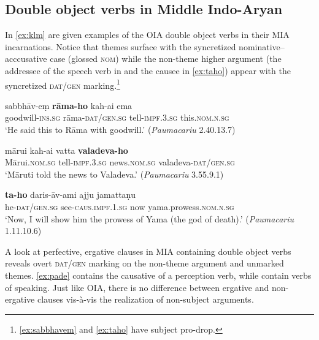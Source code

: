 \documentclass[output=paper,
modfonts
]{LSP/langsci}
\begin{document}
\subsection{Double object verbs in  Middle Indo-Aryan}
In \cref{ex:klm} are given examples of  the OIA double object  verbs in their MIA incarnations. Notice that themes surface with the syncretized nominative--acccusative case (glossed \textsc{nom}) while the non-theme higher argument (the addressee of the speech verb in  and the causee in \cref{ex:taho}) appear with the syncretized \textsc{dat/gen} marking.\footnote{\cref{ex:sabbhavem} and \cref{ex:taho} have subject pro-drop.} 
 
\begin{exe}
\ex\label{ex:klm}
\begin{xlist}
\ex\label{ex:sabbhavem}\gll sabbhāv-eṃ \textbf{rāma-ho} kah-ai ema \\ goodwill-\textsc{ins.sg} rāma-\textsc{dat/gen.sg}  tell-\textsc{impf.3.sg} this.\textsc{nom.n.sg} \\
\glt `He said this to Rāma with goodwill.' (\textit{Paumacariu}  2.40.13.7)

\ex\label{ex:marui}\gll mārui kah-ai vatta \textbf{valadeva-ho} \\ Mārui.\textsc{nom.sg}  tell-\textsc{impf.3.sg}  news.\textsc{nom.sg} valadeva-\textsc{dat/gen.sg} \\
\glt `Māruti told the news to Valadeva.' (\textit{Paumacariu} 3.55.9.1)

\ex\label{ex:taho}\gll \textbf{ta-ho} daris-āv-ami ajju jamattaṇu \\ he-\textsc{dat/gen.sg} see-\textsc{caus.impf.1.sg} now yama.prowess.\textsc{nom.n.sg} \\
\glt `Now, I will show him the prowess of Yama (the god of death).' (\textit{Paumacariu} 1.11.10.6)
\end{xlist}
\end{exe}
  

  
 A look at perfective, ergative clauses in MIA  containing double object verbs  reveals overt \textsc{dat/gen} marking on the non-theme argument and unmarked themes. \cref{ex:pade} contains the causative of a perception verb, while  contain verbs of speaking. Just like OIA, there is no  difference between ergative and non-ergative clauses vis-à-vis the realization of non-subject arguments.  
 
\end{document}
